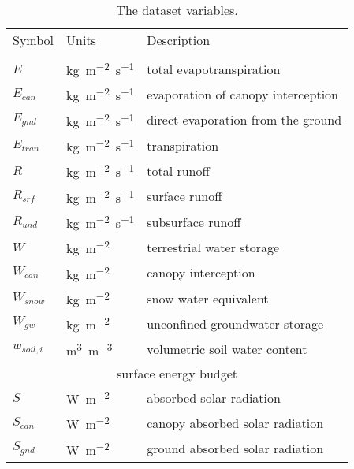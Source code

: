 \documentclass[essd]{copernicus}
\begin{document}
\begin{table}[t]
    \caption{The dataset variables.}
    \label{tbl:variables}
    \centering
    \begin{tabular}{lll}
        \tophline
        Symbol       & Units                   & Description                                \\
        \middlehline
        \multicolumn{3}{c}{surface water budget}                                            \\
        $E$          & \unit{kg~m^{-2}~s^{-1}} & total evapotranspiration                   \\
        $E_{can}$    & \unit{kg~m^{-2}~s^{-1}} & evaporation of canopy interception         \\
        $E_{gnd}$    & \unit{kg~m^{-2}~s^{-1}} & direct evaporation from the ground         \\
        $E_{tran}$   & \unit{kg~m^{-2}~s^{-1}} & transpiration                              \\
        $R$          & \unit{kg~m^{-2}~s^{-1}} & total runoff                               \\
        $R_{srf}$    & \unit{kg~m^{-2}~s^{-1}} & surface runoff                             \\
        $R_{und}$    & \unit{kg~m^{-2}~s^{-1}} & subsurface runoff                          \\
        $W$          & \unit{kg~m^{-2}}        & terrestrial water storage                  \\
        $W_{can}$    & \unit{kg~m^{-2}}        & canopy interception                        \\
        $W_{snow}$   & \unit{kg~m^{-2}}        & snow water equivalent                      \\
        $W_{gw}$     & \unit{kg~m^{-2}}        & unconfined groundwater storage             \\
        $w_{soil,i}$ & \unit{m^3~m^{-3}}       & volumetric soil water content              \\
        [1mm]
        \multicolumn{3}{c}{surface energy budget}                                           \\
        $S$          & \unit{W~m^{-2}}         & absorbed solar radiation                   \\
        $S_{can}$    & \unit{W~m^{-2}}         & canopy absorbed solar radiation            \\
        $S_{gnd}$    & \unit{W~m^{-2}}         & ground absorbed solar radiation            \\

\end{tabular}
\end{table}
\end{document}
